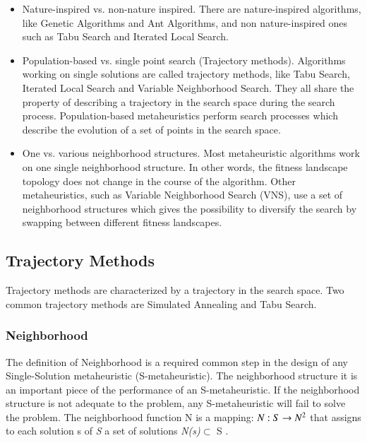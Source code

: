 \documentclass[espaco=umemeio,chapter=TITLE,twoside,openright]{abnt}
\begin{document}
\begin{itemize}
\item Nature-inspired vs. non-nature inspired. There are nature-inspired algorithms, like Genetic Algorithms and Ant Algorithms, and non nature-inspired ones such as Tabu Search and Iterated Local Search.

\item Population-based vs. single point search (Trajectory methods). Algorithms working on single solutions are called trajectory methods, like Tabu Search, Iterated Local Search and Variable Neighborhood Search. They all share the property of describing a trajectory in the search space during the search process. Population-based metaheuristics perform search processes which describe the evolution of a set of points in the search space.

\item One vs. various neighborhood structures. Most metaheuristic algorithms work on one single neighborhood structure. In other words, the fitness landscape topology does not change in the course of the algorithm. Other metaheuristics, such as Variable Neighborhood Search (VNS), use a set of neighborhood structures which gives the possibility to diversify the search by swapping between different fitness
landscapes.


\end{itemize}

\subsection{Trajectory Methods}

Trajectory methods are characterized by a trajectory in the search space. Two common trajectory methods are Simulated Annealing and Tabu Search.

\subsubsection{Neighborhood}

The definition of Neighborhood is a required common step in the design of any Single-Solution metaheuristic (S-metaheuristic). The neighborhood structure it is an important piece of the performance of an S-metaheuristic. If the neighborhood structure is not adequate to the problem,
any S-metaheuristic will fail to solve the problem. The neighborhood function N is a mapping: $ N : S \rightarrow N\textsuperscript{2} $ that assigns to each solution s of \textit{S} a set of solutions \textit{N(s)}$\subset$ S \cite{Talbi2013}.
\end{document}
